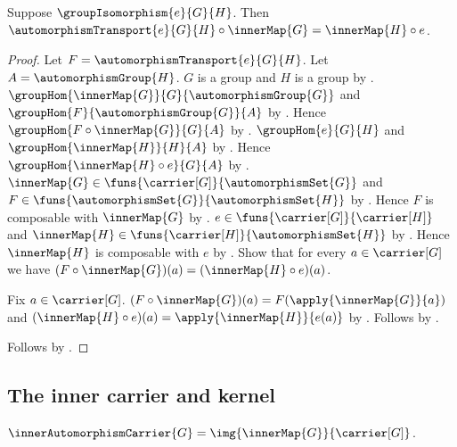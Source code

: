 \begin{theorem}\label{automorphism_transport_inner_naturality}
    Suppose $\groupIsomorphism{e}{G}{H}$.
    Then
        $\automorphismTransport{e}{G}{H}\circ\innerMap{G}=
            \innerMap{H}\circ e$.
\end{theorem}
\begin{proof}
    Let $F=\automorphismTransport{e}{G}{H}$.
    Let $A=\automorphismGroup{H}$.
    $G$ is a group and $H$ is a group by
        .
    $\groupHom{\innerMap{G}}{G}{\automorphismGroup{G}}$ and
        $\groupHom{F}{\automorphismGroup{G}}{A}$ by
        .
    Hence
        $\groupHom{F\circ\innerMap{G}}{G}{A}$ by
        .
    $\groupHom{e}{G}{H}$ and $\groupHom{\innerMap{H}}{H}{A}$ by
        .
    Hence $\groupHom{\innerMap{H}\circ e}{G}{A}$ by
        .
    $\innerMap{G}\in\funs{\carrier[G]}{\automorphismSet{G}}$ and
        $F\in\funs{\automorphismSet{G}}{\automorphismSet{H}}$ by
        .
    Hence $F$ is composable with $\innerMap{G}$ by
        .
    $e\in\funs{\carrier[G]}{\carrier[H]}$ and
        $\innerMap{H}\in\funs{\carrier[H]}{\automorphismSet{H}}$ by
        .
    Hence $\innerMap{H}$ is composable with $e$ by
        .
    Show that for every $a\in\carrier[G]$ we have
        $(F\circ\innerMap{G})(a)=(\innerMap{H}\circ e)(a)$.
    \begin{subproof}
        Fix $a\in\carrier[G]$.
        $(F\circ\innerMap{G})(a)=F(\apply{\innerMap{G}}{a})$ and
            $(\innerMap{H}\circ e)(a)=\apply{\innerMap{H}}{e(a)}$ by
            .
        Follows by .
    \end{subproof}
    Follows by .
\end{proof}

\subsection{The inner carrier and kernel}

\begin{definition}\label{inner_automorphism_carrier}
    $\innerAutomorphismCarrier{G}=
        \img{\innerMap{G}}{\carrier[G]}$.
\end{definition}

